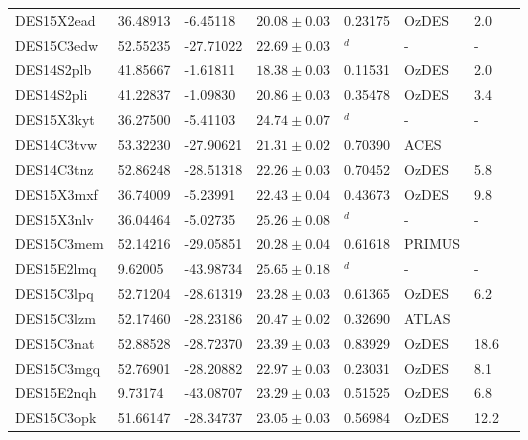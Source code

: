 \documentclass[fleqn,usenatbib,]{mnras}
\begin{document}
\begin{table}
\begin{threeparttable}
\begin{tabular}{llllllll}
DES15X2ead     & 36.48913 &  -6.45118 & $20.08 \pm 0.03$ & 0.23175 &      OzDES &       2.0 \\
DES15C3edw     & 52.55235 & -27.71022 & $22.69 \pm 0.03$ &    $^d$ &          - &             - \\
DES14S2plb     & 41.85667 &  -1.61811 & $18.38 \pm 0.03$ & 0.11531 &      OzDES &       2.0 \\
DES14S2pli     & 41.22837 &  -1.09830 & $20.86 \pm 0.03$ & 0.35478 &      OzDES &       3.4 \\
DES15X3kyt     & 36.27500 &  -5.41103 & $24.74 \pm 0.07$ &    $^d$ &          - &             - \\
DES14C3tvw     & 53.32230 & -27.90621 & $21.31 \pm 0.02$ & 0.70390 &       ACES &               \\
DES14C3tnz     & 52.86248 & -28.51318 & $22.26 \pm 0.03$ & 0.70452 &      OzDES &       5.8 \\
DES15X3mxf     & 36.74009 &  -5.23991 & $22.43 \pm 0.04$ & 0.43673 &      OzDES &       9.8 \\
DES15X3nlv     & 36.04464 &  -5.02735 & $25.26 \pm 0.08$ &    $^d$ &          - &             - \\
DES15C3mem     & 52.14216 & -29.05851 & $20.28 \pm 0.04$ & 0.61618 &     PRIMUS &               \\
DES15E2lmq     &  9.62005 & -43.98734 & $25.65 \pm 0.18$ &    $^d$ &          - &             - \\
DES15C3lpq     & 52.71204 & -28.61319 & $23.28 \pm 0.03$ & 0.61365 &      OzDES &       6.2 \\
DES15C3lzm     & 52.17460 & -28.23186 & $20.47 \pm 0.02$ & 0.32690 &      ATLAS &               \\
DES15C3nat     & 52.88528 & -28.72370 & $23.39 \pm 0.03$ & 0.83929 &      OzDES &      18.6 \\
DES15C3mgq     & 52.76901 & -28.20882 & $22.97 \pm 0.03$ & 0.23031 &      OzDES &       8.1 \\
DES15E2nqh     &  9.73174 & -43.08707 & $23.29 \pm 0.03$ & 0.51525 &      OzDES &       6.8 \\
DES15C3opk     & 51.66147 & -28.34737 & $23.05 \pm 0.03$ & 0.56984 &      OzDES &      12.2 \\


\end{tabular}
\end{threeparttable}
\end{table}
\end{document}
